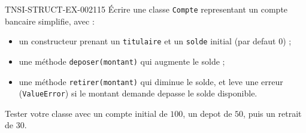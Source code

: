 \begin{exercice}{TNSI-STRUCT-EX-002}{1}{15}
Écrire une classe \lstinline{Compte} representant un compte bancaire simplifie, avec :
\begin{itemize}
  \item un constructeur prenant un \lstinline{titulaire} et un \lstinline{solde} initial (par defaut $0$) ;
  \item une méthode \lstinline{deposer(montant)} qui augmente le solde ;
  \item une méthode \lstinline{retirer(montant)} qui diminue le solde, et leve une erreur (\lstinline{ValueError}) si le montant demande depasse le solde disponible.
\end{itemize}
Tester votre classe avec un compte initial de $100$, un depot de $50$, puis un retrait de $30$.
\end{exercice}
